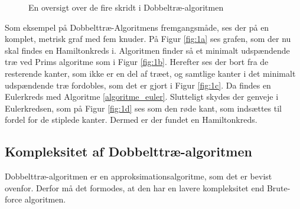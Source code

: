 \begin{figure}[htbp]
\centering
	\begin{minipage}[t]{0.5\textwidth}
		\centering
			\scalebox{0.7}{}
		\label{dtex1}
		\label{fig:1a}
	\end{minipage}%
	\begin{minipage}[t]{0.5\textwidth}
		\centering
			\scalebox{0.7}{}
		\label{dtex2}
		\label{fig:1b}
	\end{minipage}

	\vspace{10mm}

	\begin{minipage}[t]{0.5\textwidth}
		\centering		
			\scalebox{0.7}{}
		\label{dtex3}
		\label{fig:1c}
	\end{minipage}%
	\begin{minipage}[t]{0.5\textwidth}
		\centering
			\scalebox{0.7}{}
		\label{dtex4}
		\label{fig:1d}
	\end{minipage}

	\vspace{5mm}

	\caption{En oversigt over de fire skridt i Dobbeltræ-algoritmen} \label{fig:1}
\end{figure}

\begin{exmp}
	Som eksempel på Dobbelttræ-Algoritmens fremgangsmåde, ses der på en komplet, metrisk graf med fem knuder.
På Figur \ref{fig:1a} ses grafen, som der nu skal findes en Hamiltonkreds i.
	Algoritmen finder så et minimalt udspændende træ ved Prims algoritme som i Figur \ref{fig:1b}.
	Herefter ses der bort fra de resterende kanter, som ikke er en del af træet, og samtlige kanter i det minimalt udspændende træ fordobles, som det er gjort i Figur \ref{fig:1c}.
	Da findes en Eulerkreds med Algoritme \ref{algoritme_euler}.
	Slutteligt skydes der genveje i Eulerkredsen, som på Figur \ref{fig:1d} ses som den røde kant, som indsættes til fordel for de stiplede kanter. Dermed er der fundet en Hamiltonkreds.
\end{exmp}

\subsection{Kompleksitet af Dobbelttræ-algoritmen}
Dobbelttræ-algoritmen er en approksimationsalgoritme, som det er bevist ovenfor. Derfor må det formodes, at den har en lavere kompleksitet end Brute-force algoritmen.

